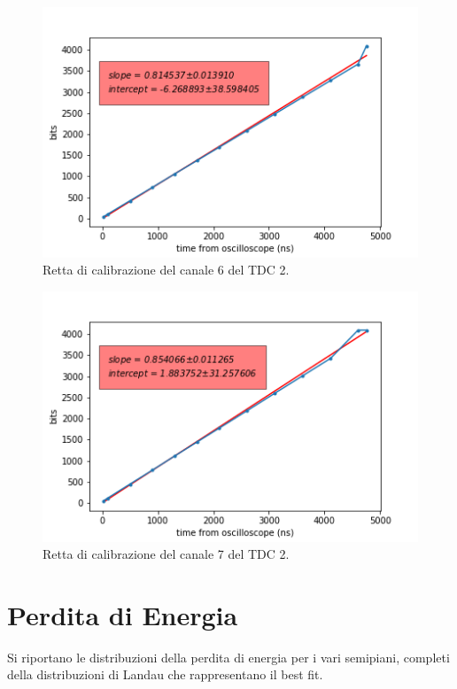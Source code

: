 \begin{figure}[H]
  \centering
  \includegraphics[width=.8\textwidth]{plots/tdc26.png}
  \caption{Retta di calibrazione del canale 6 del TDC 2.}
  \label{fig:tdc26}
\end{figure}

\begin{figure}[H]
  \centering
  \includegraphics[width=.8\textwidth]{plots/tdc27.png}
  \caption{Retta di calibrazione del canale 7 del TDC 2.}
  \label{fig:tdc27}
\end{figure}




\chapter{Perdita di Energia}             %
Si riportano le distribuzioni della perdita di energia per i vari semipiani, completi della distribuzioni di Landau che rappresentano il best fit.


